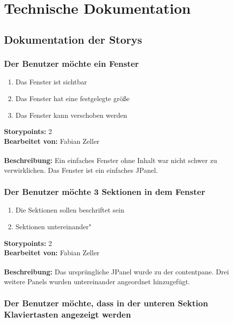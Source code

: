 \section{Technische Dokumentation}
\subsection{Dokumentation der Storys}

\subsubsection{Der Benutzer möchte ein Fenster}

\begin{enumerate}
 \item Das Fenster ist sichtbar
 \item Das Fenster hat eine festgelegte größe
 \item Das Fenster kann verschoben werden
\end{enumerate}

\textbf{Storypoints:} 2 \\
\textbf{Bearbeitet von:} Fabian Zeller \\
\\
\textbf{Beschreibung:} Ein einfaches Fenster ohne Inhalt war nicht schwer zu verwirklichen. Das Fenster ist ein einfaches JPanel.


\subsubsection{Der Benutzer möchte 3 Sektionen in dem Fenster}


\begin{enumerate}
 \item Die Sektionen sollen beschriftet sein
 \item Sektionen untereinander"
\end{enumerate}

\textbf{Storypoints:} 2 \\
\textbf{Bearbeitet von:} Fabian Zeller \\
\\
\textbf{Beschreibung:} Das ursprüngliche JPanel wurde zu der contentpane. Drei weitere Panels wurden untereinander angeordnet hinzugefügt.


\subsubsection{Der Benutzer möchte, dass in der unteren Sektion Klaviertasten angezeigt werden}

